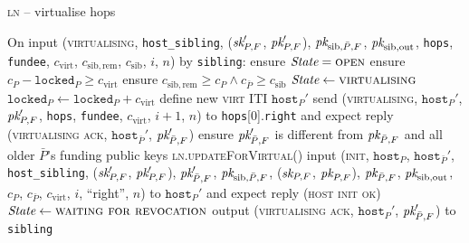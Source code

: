 \begin{center}
\begin{processbox}{\textsc{ln} -- virtualise hops}
\begin{algorithmic}[1]
      \State On input (\textsc{virtualising}, \texttt{host\_sibling}, ($\textit{sk}_{P,
      F}'$, $\textit{pk}_{P, F}'$), $\textit{pk}_{\mathrm{sib}, \bar{P}, F}$, $\textit{pk}_{\mathrm{sib},
      \mathrm{out}}$, \texttt{hops}, \texttt{fundee}, $c_{\mathrm{virt}}$,
      $c_{\mathrm{sib}, \mathrm{rem}}$, $c_{\mathrm{sib}}$, $i$, $n$) by
      \texttt{sibling}:
      \Indent
        \State ensure $\itistate = \textsc{open}$
        \State ensure $c_P - \texttt{locked}_P \geq c_{\mathrm{virt}}$
        \State ensure $c_{\mathrm{sib}, \mathrm{rem}} \geq c_P \wedge
        c_{\bar{P}} \geq c_{\mathrm{sib}}$ 
        \State $\itistate \gets \textsc{virtualising}$
        \State $\texttt{locked}_P \gets \texttt{locked}_P + c_{\mathrm{virt}}$
        \State define new \textsc{virt} ITI $\texttt{host}_P'$
        \State send (\textsc{virtualising}, $\texttt{host}_P'$, $\textit{pk}_{P, F}'$,
        \texttt{hops}, \texttt{fundee}, $c_{\mathrm{virt}}$, $i+1$, $n$) to
        \texttt{hops}[0].\texttt{right} and expect reply (\textsc{virtualising
        ack}, $\texttt{host}_{\bar{P}}'$, $\textit{pk}_{\bar{P}, F}'$)
        \State ensure $\textit{pk}_{\bar{P}, F}'$ is different from $\textit{pk}_{\bar{P}, F}$ and
        all older $\bar{P}$'s funding public keys
        \State \textsc{ln}.\textsc{updateForVirtual}()
        \State input (\textsc{init}, $\texttt{host}_P$,
        $\texttt{host}_{\bar{P}}'$, \texttt{host\_sibling}, ($\textit{sk}_{P, F}'$,
        $\textit{pk}_{P, F}'$), $\textit{pk}_{\bar{P}, F}'$, $\textit{pk}_{\mathrm{sib}, \bar{P}, F}$,
        ($\textit{sk}_{P, F}$, $\textit{pk}_{P, F}$), $\textit{pk}_{\bar{P}, F}$, $\textit{pk}_{\mathrm{sib},
        \mathrm{out}}$, $c_P$, $c_{\bar{P}}$, $c_{\mathrm{virt}}$, $i$,
        ``right'', $n$) to $\texttt{host}_P'$ and expect reply (\textsc{host
        init ok})
        \State $\itistate \gets \textsc{waiting for revocation}$
        \State output (\textsc{virtualising ack}, $\texttt{host}_P'$,
        $\textit{pk}_{\bar{P}, F}'$) to \texttt{sibling}
      \EndIndent
    \end{algorithmic}
  \end{processbox}
  \label{code:ln:open:virtualise:hops}
\end{center} \ \\

